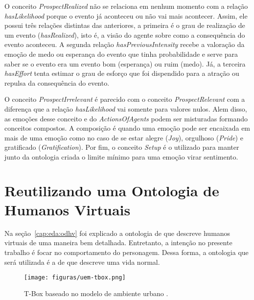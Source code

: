 O conceito \emph{ProspectRealized} não se relaciona em nenhum momento com a
relação \emph{hasLikelihood} porque o evento já aconteceu ou não vai mais
acontecer. Assim, ele possui três relações distintas das anteriores, a
primeira é o grau de realização de um evento (\emph{hasRealized}), isto é, a
visão do agente sobre como a consequência do evento aconteceu. A segunda
relação \emph{hasPreviousIntensity} recebe a valoração da emoção de medo ou
esperança do evento que tinha probabilidade e serve para saber se o evento era
um evento bom (esperança) ou ruim (medo). Já, a terceira \emph{hasEffort}
tenta estimar o grau de esforço que foi dispendido para a atração ou repulsa
da consequência do evento.

O conceito \emph{ProspectIrrelevant} é parecido com o conceito
\emph{ProspectRelevant} com a diferença que a relação \emph{hasLikelihood} vai
somente para valores nulos. Alem disso, as emoções desse conceito e do
\emph{ActionsOfAgents} podem ser misturadas formando conceitos compostos.
A composição é quando uma emoção pode ser encaixada em mais de uma emoção
como no caso de se estar alegre (\emph{Joy}), orgulhoso (\emph{Pride}) e
gratificado (\emph{Gratification}). Por fim, o conceito \emph{Setup}
 é o utilizado para manter junto da
ontologia criada o limite mínimo para uma emoção virar sentimento\dev{}.


\section{Reutilizando uma Ontologia de Humanos Virtuais} \label{cap:tp:ruodhv}

Na seção~\ref{cap:eda:odhv} foi explicado a ontologia de
\citet{Gutierrez:2007:OVH:1229160.1229164} que descreve humanos virtuais de
uma maneira bem detalhada. Entretanto, a intenção no presente trabalho é
focar no comportamento do personagem. Dessa forma, a ontologia que será
utilizada é a de \citet{paiva2005ontology} que descreve uma vida normal.

\begin{figure}[t]
  \centering
    \texttt{[image: figuras/uem-tbox.png]}
  \caption{T-Box baseado no modelo de ambiente urbano \cite{paiva2005ontology}.}
  \label{fig:UEM:TBOX}
\end{figure}


